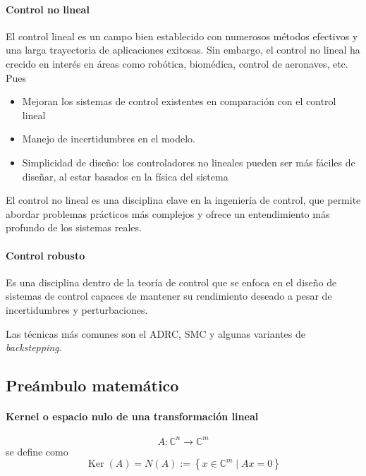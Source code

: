 \begin{flushright}
\end{flushright}

\paragraph{Control no lineal}
El control lineal es un campo bien establecido con numerosos métodos efectivos
y una larga trayectoria de aplicaciones exitosas. Sin embargo, el control no
lineal ha crecido en interés en áreas como robótica, biomédica, control de
aeronaves, etc. Pues

\begin{itemize}
  \item Mejoran los sistemas de control existentes en comparación con el
    control lineal
  \item Manejo de incertidumbres en el modelo.
  \item Simplicidad de diseño: los controladores no lineales pueden ser más
    fáciles de diseñar, al estar basados en la física del sistema
\end{itemize}

El control no lineal es una disciplina clave en la ingeniería de control, que
permite abordar problemas prácticos más complejos y ofrece un entendimiento
más profundo de los sistemas reales.

\paragraph{Control robusto}
Es una disciplina dentro de la teoría de control que se enfoca en el diseño de
sistemas de control capaces de mantener su rendimiento deseado a pesar de
incertidumbres y perturbaciones.

Las técnicas más comunes son el ADRC, SMC y algunas variantes de
\textit{backstepping}.

\subsection{Preámbulo matemático}

\paragraph{Kernel o espacio nulo de una transformación lineal}
\[
  A\colon \mathbb{C}^{n}\longrightarrow\mathbb{C}^{m}
\]
se define como
\[
  \operatorname{Ker}(A)=N(A)
  :=\left\{x\in\mathbb{C}^{m}\mid Ax=0\right\}
\]

